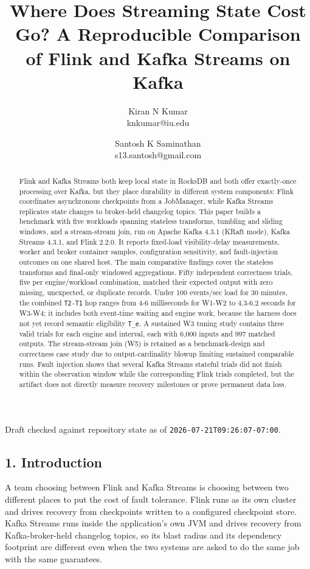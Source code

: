 \documentclass[
]{article}
\author{}
\date{}
\title{Where Does Streaming State Cost Go? A Reproducible Comparison of Flink and Kafka Streams on Kafka}
\author{Kiran N Kumar \\ knkumar@iu.edu \and Santosh K Saminathan \\ s13.santosh@gmail.com}
\begin{document}
\maketitle



Draft checked against repository state as of
\texttt{2026-07-21T09:26:07-07:00}.

\begin{abstract}
Flink and Kafka Streams both keep local state in RocksDB and both offer
exactly-once processing over Kafka, but they place durability in
different system components: Flink coordinates asynchronous checkpoints
from a JobManager, while Kafka Streams replicates state changes to
broker-held changelog topics. This paper builds a benchmark with five
workloads spanning stateless transforms, tumbling and sliding windows,
and a stream-stream join, run on Apache Kafka 4.3.1 (KRaft mode), Kafka
Streams 4.3.1, and Flink 2.2.0. It reports fixed-load visibility-delay
measurements, worker and broker container samples, configuration
sensitivity, and fault-injection outcomes on one shared host. The main
comparative findings cover the stateless transforms and final-only 
windowed aggregations. Fifty independent correctness trials, five per 
engine/workload combination, matched their expected output with zero 
missing, unexpected, or duplicate records. Under 100 events/sec load 
for 30 minutes, the combined \texttt{T2-T1} hop ranges from 4-6 
milliseconds for W1-W2 to 4.3-6.2 seconds for W3-W4; it includes both 
event-time waiting and engine work, because the harness does not yet 
record semantic eligibility \texttt{T\_e}. A sustained W3 tuning study 
contains three valid trials for each engine and interval, each with 
6,000 inputs and 997 matched outputs. The stream-stream join (W5) is 
retained as a benchmark-design and correctness case study due to 
output-cardinality blowup limiting sustained comparable runs. Fault 
injection shows that several Kafka Streams stateful trials did not 
finish within the observation window while the corresponding Flink 
trials completed, but the artifact does not directly measure recovery 
milestones or prove permanent data loss.
\end{abstract}

\hypertarget{introduction}{%
\subsection{1. Introduction}\label{introduction}}

A team choosing between Flink and Kafka Streams is choosing between two
different places to put the cost of fault tolerance. Flink runs as its
own cluster and drives recovery from checkpoints written to a configured
checkpoint store. Kafka Streams runs inside the application's own JVM
and drives recovery from Kafka-broker-held changelog topics, so its
blast radius and its dependency footprint are different even when the
two systems are asked to do the same job with the same guarantees.
\end{document}
